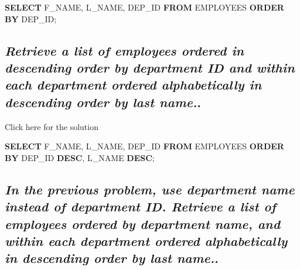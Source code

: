 \documentclass[
]{book}
\newenvironment{Shaded}{\begin{snugshade}}{\end{snugshade}}
\newcommand{\KeywordTok}[1]{\textcolor[rgb]{0.13,0.29,0.53}{\textbf{#1}}}
\newcommand{\NormalTok}[1]{#1}
\begin{document}
\begin{Shaded}
\begin{Highlighting}[]
\KeywordTok{SELECT}\NormalTok{ F\_NAME, L\_NAME, DEP\_ID }
\KeywordTok{FROM}\NormalTok{ EMPLOYEES}
\KeywordTok{ORDER} \KeywordTok{BY}\NormalTok{ DEP\_ID;}
\end{Highlighting}
\end{Shaded}

\hypertarget{retrieve-a-list-of-employees-ordered-in-descending-order-by-department-id-and-within-each-department-ordered-alphabetically-in-descending-order-by-last-name..}{%
\subsection{\texorpdfstring{\emph{Retrieve a list of employees ordered in descending order by department ID and within each department ordered alphabetically in descending order by last name.}.}{Retrieve a list of employees ordered in descending order by department ID and within each department ordered alphabetically in descending order by last name..}}\label{retrieve-a-list-of-employees-ordered-in-descending-order-by-department-id-and-within-each-department-ordered-alphabetically-in-descending-order-by-last-name..}}

Click here for the solution

\begin{Shaded}
\begin{Highlighting}[]
\KeywordTok{SELECT}\NormalTok{ F\_NAME, L\_NAME, DEP\_ID }
\KeywordTok{FROM}\NormalTok{ EMPLOYEES}
\KeywordTok{ORDER} \KeywordTok{BY}\NormalTok{ DEP\_ID }\KeywordTok{DESC}\NormalTok{, L\_NAME }\KeywordTok{DESC}\NormalTok{;}
\end{Highlighting}
\end{Shaded}

\hypertarget{in-the-previous-problem-use-department-name-instead-of-department-id.-retrieve-a-list-of-employees-ordered-by-department-name-and-within-each-department-ordered-alphabetically-in-descending-order-by-last-name..}{%
\subsection{\texorpdfstring{\emph{In the previous problem, use department name instead of department ID. Retrieve a list of employees ordered by department name, and within each department ordered alphabetically in descending order by last name.}.}{In the previous problem, use department name instead of department ID. Retrieve a list of employees ordered by department name, and within each department ordered alphabetically in descending order by last name..}}\label{in-the-previous-problem-use-department-name-instead-of-department-id.-retrieve-a-list-of-employees-ordered-by-department-name-and-within-each-department-ordered-alphabetically-in-descending-order-by-last-name..}}
\end{document}
